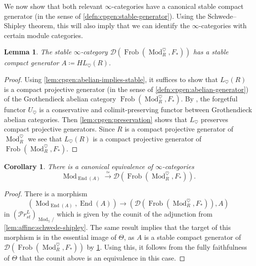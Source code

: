 \documentclass{article}
\theoremstyle{definition}
\theoremstyle{definition}
\theoremstyle{definition}
\theoremstyle{plain}
\newtheorem{lem}[defn]{Lemma}
\theoremstyle{plain}
\theoremstyle{plain}
\newtheorem{cor}[defn]{Corollary}
\theoremstyle{plain}
\theoremstyle{plain}
\theoremstyle{plain}
\theoremstyle{plain}
\theoremstyle{plain}
\theoremstyle{remark}
\theoremstyle{remark}
\theoremstyle{plain}
\theoremstyle{plain}
\theoremstyle{plain}
\theoremstyle{plain}
\theoremstyle{plain}
\newcommand{\Mod}[1]{\operatorname{Mod}_{#1}}
\newcommand{\ModDisc}[1]{\operatorname{Mod}_{#1}^{\heartsuit}}
\newcommand{\Frob}[2]{\operatorname{Frob}(#1, #2)}
\newcommand{\End}[1]{\operatorname{End}(#1)}
\renewcommand{\S}{\mathbb{S}}
\newcommand{\Cat}[1]{\mathcal{#1}}
\newcommand{\PrSt}{\mathcal{P}r^{L}_{st}}
\begin{document}
We now show that both relevant $\infty$-categories have a canonical stable compact generator (in the sense of \cref{defn:cpgen:stable-generator}).
Using the Schwede--Shipley theorem, this will also imply that we can identify the $\infty$-categories with certain module categories.
\begin{lem} \label{lem:affine:DFrob-cp-gen}
    The stable $\infty$-category $\Cat{D}(\Frob{\ModDisc{R}}{F_*})$
    has a stable compact generator $A \coloneqq HL_\heartsuit(R)$.
\end{lem}
\begin{proof}
    Using \cref{lem:cpgen:abelian-implies-stable}, it suffices to show that $L_\heartsuit(R)$ is a compact projective generator (in the sense of \cref{defn:cpgen:abelian-generator})
    of the Grothendieck abelian category $\Frob{\ModDisc{R}}{F_*}$.
    By \cite[Corollary 2.8]{cartmod}, the forgetful functor $U_{\heartsuit}$
    is a conservative and colimit-preserving functor between Grothendieck abelian categories.
    Then \cref{lem:cpgen:preservation} shows that $L_\heartsuit$ preserves compact projective generators.
    Since $R$ is a compact projective generator of $\ModDisc{R}$
    we see that $L_{\heartsuit}(R)$ is a compact projective generator of $\Frob{\ModDisc{R}}{F_*}$.
\end{proof}

\begin{cor} \label{lem:affine:DFrob-is-module-cat}
    There is a canonical equivalence of $\infty$-categories
    \begin{equation*}
        \Mod{\End{A}} \xrightarrow{\simeq} \Cat D(\Frob{\ModDisc{R}}{F_*}).
    \end{equation*}
\end{cor}
\begin{proof}
    There is a morphism
    \begin{equation*}
        (\Mod{\End{A}}, \End{A}) \to (\Cat D(\Frob{\ModDisc{R}}{F_*}), A)
    \end{equation*}
    in ${(\PrSt)}_{{\Mod{\S}}/}$ which is given by the counit of the adjunction from \cref{lem:affine:schwede-shipley}.
    The same result implies that the target of this morphism is in the essential image of $\Theta$,
    as $A$ is a stable compact generator of $\Cat D(\Frob{\ModDisc{R}}{F_*})$ by \cref{lem:affine:DFrob-cp-gen}.
    Using this, it follows from the fully faithfulness of $\Theta$ that the counit above
    is an equivalence in this case.
\end{proof}
\end{document}
